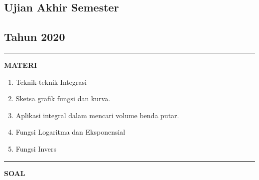 \newpage
\begin{flushright}
    \section*{\Large{Ujian Akhir Semester}}
    \subsection*{Tahun 2020}
\end{flushright}
\vspace{0.5cm}
\hrule height 2pt
\vspace{0.5cm}
\begin{center}
    \textbf{\large{MATERI}}
    \begin{enumerate}[leftmargin=*, label={\arabic*}.]
        \item Teknik-teknik Integrasi
        \item Sketsa grafik fungsi dan kurva.
        \item Aplikasi integral dalam mencari volume benda putar.
        \item Fungsi Logaritma dan Eksponensial
        \item Fungsi Invers
    \end{enumerate}
\end{center}
\vspace{0.2cm}
\hrule height 1pt
\vspace{0.5cm}
\begin{center}
    \textbf{\large{SOAL}}
\end{center}
